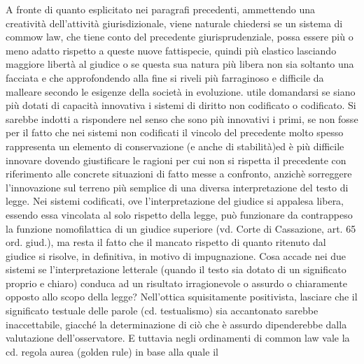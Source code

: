 A fronte di quanto esplicitato nei paragrafi precedenti, ammettendo una creatività dell'attività giurisdizionale, viene naturale chiedersi se un sistema di commow law, che tiene conto del precedente giurisprudenziale, possa essere più o meno adatto rispetto a queste nuove fattispecie, quindi più elastico lasciando maggiore libertà al giudice o se questa sua natura più libera non sia soltanto una facciata e che approfondendo alla fine si riveli più farraginoso e difficile da malleare secondo le esigenze della società in evoluzione. %
utile domandarsi se siano più dotati di capacità innovativa i sistemi di diritto non codificato o codificato. Si sarebbe indotti a rispondere nel senso che sono più innovativi i primi, se non fosse per il fatto che nei sistemi non codificati il vincolo del precedente molto spesso rappresenta un elemento di conservazione (e anche di stabilità)ed è più difficile innovare dovendo giustificare le ragioni per cui non si rispetta il precedente con riferimento alle concrete situazioni di fatto messe a confronto, anzichè sorreggere l'innovazione sul terreno più semplice di una diversa interpretazione del testo di legge. Nei sistemi codificati, ove l'interpretazione del giudice si appalesa libera, essendo essa vincolata al solo rispetto della legge, può funzionare da contrappeso la funzione nomofilattica di un giudice superiore (vd. Corte di Cassazione, art. 65 ord. giud.), ma resta il fatto che il mancato rispetto di quanto ritenuto dal giudice si risolve, in definitiva, in motivo di impugnazione. Cosa accade nei due sistemi se l'interpretazione letterale (quando il testo sia dotato di un significato proprio e chiaro) conduca
ad un risultato irragionevole o assurdo o chiaramente opposto allo scopo della legge?
Nell'ottica squisitamente positivista, lasciare che il significato testuale delle parole (cd. testualismo) sia accantonato sarebbe inaccettabile, giacché la determinazione di ciò che è assurdo dipenderebbe dalla valutazione dell'osservatore. E tuttavia negli ordinamenti di common law vale la cd. regola aurea (golden rule) in base alla quale il
